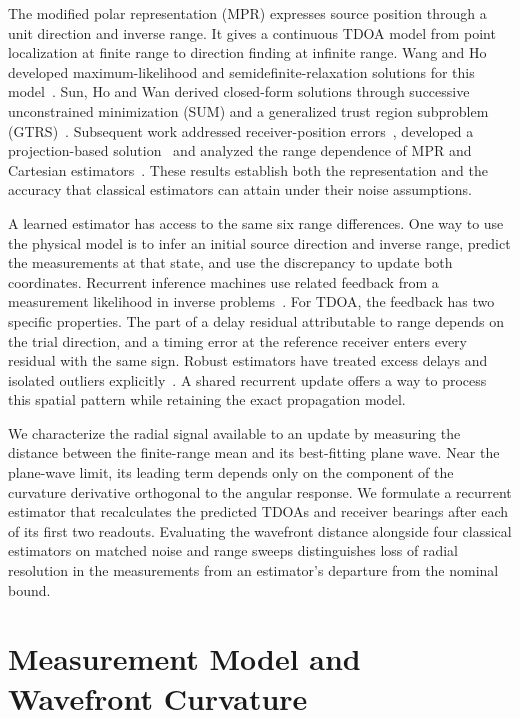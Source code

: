 \documentclass[journal]{IEEEtran}
\begin{document}
The modified polar representation (MPR) expresses source position through a unit direction and inverse range. It gives a continuous TDOA model from point localization at finite range to direction finding at infinite range. Wang and Ho developed maximum-likelihood and semidefinite-relaxation solutions for this model~\cite{wangho2017}. Sun, Ho and Wan derived closed-form solutions through successive unconstrained minimization (SUM) and a generalized trust region subproblem (GTRS)~\cite{sunho2019}. Subsequent work addressed receiver-position errors~\cite{suniot2022}, developed a projection-based solution~\cite{sun2024projection} and analyzed the range dependence of MPR and Cartesian estimators~\cite{sun2026comparison}. These results establish both the representation and the accuracy that classical estimators can attain under their noise assumptions.

A learned estimator has access to the same six range differences. One way to use the physical model is to infer an initial source direction and inverse range, predict the measurements at that state, and use the discrepancy to update both coordinates. Recurrent inference machines use related feedback from a measurement likelihood in inverse problems~\cite{putzky2017}. For TDOA, the feedback has two specific properties. The part of a delay residual attributable to range depends on the trial direction, and a timing error at the reference receiver enters every residual with the same sign. Robust estimators have treated excess delays and isolated outliers explicitly~\cite{wangso2016,wangho2023fullset}. A shared recurrent update offers a way to process this spatial pattern while retaining the exact propagation model.

We characterize the radial signal available to an update by measuring the distance between the finite-range mean and its best-fitting plane wave. Near the plane-wave limit, its leading term depends only on the component of the curvature derivative orthogonal to the angular response. We formulate a recurrent estimator that recalculates the predicted TDOAs and receiver bearings after each of its first two readouts. Evaluating the wavefront distance alongside four classical estimators on matched noise and range sweeps distinguishes loss of radial resolution in the measurements from an estimator's departure from the nominal bound.

\section{Measurement Model and Wavefront Curvature}
\label{sec:model}
\end{document}
